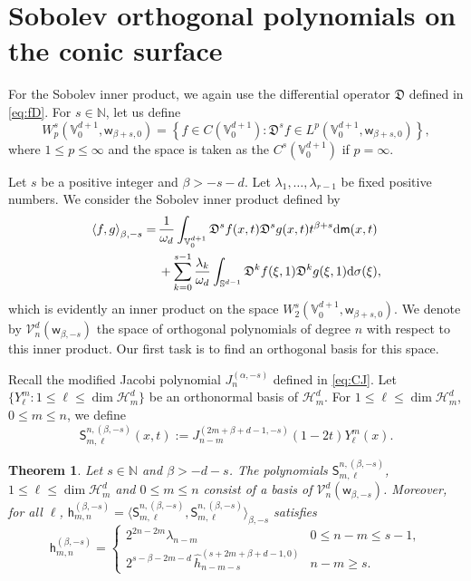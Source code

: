 \documentclass{amsart}
\newtheorem{thm}{Theorem}[section]
\theoremstyle{remark}
\def\la{{\langle}}
\def\ra{{\rangle}}
\def\d{\mathrm{d}}
\def\sh{{\mathsf h}}
\def\sm{{\mathsf m}}
\def\sw{{\mathsf w}}
\def\sS{{\mathsf S}}
\def\fD{{\mathfrak D}}
\def\a{{\alpha}}
\def\b{{\beta}}
\def\l{{\lambda}}
\def\o{{\omega}}
\def\s{\sigma}
\def\la{{\langle}}
\def\ra{{\rangle}}
\def\CH{{\mathcal H}}
\def\CV{{\mathcal V}}
\def\NN{{\mathbb N}}
\def\SS{{\mathbb S}}
\def\VV{{\mathbb V}}
\newcommand{\wh}{\widehat}
\begin{document}
\section{Sobolev orthogonal polynomials on the conic surface}
\setcounter{equation}{0}

For the Sobolev inner product, we again use the differential operator $\fD$ defined in \eqref{eq:fD}. 
For $s \in \NN$, let us define 
$$
W_p^s(\VV_0^{d+1}, \sw_{\b+s,0})= \left \{f\in C(\VV_0^{d+1}): \fD^s f\in L^p(\VV_0^{d+1},\sw_{\b+s,0})\right \},
$$
where $1 \le p \le \infty$ and the space is taken as the $C^s(\VV_0^{d+1})$ if $p = \infty$.

Let $s$ be a positive integer and $\b > -s-d$. Let $\l_1,\ldots,\l_{r-1}$ be fixed positive numbers. 
We consider the Sobolev inner product defined by
\begin{align} \label{eq:ipd-s}
  \la f,g\ra_{\b, -s} =\,& \frac{1}{\o_d}
       \int_{\VV_0^{d+1}} \fD^s f (x,t) \fD^s g(x,t) t^{\b+s} \d \sm(x,t)\\\
           &  + \sum_{k=0}^{s-1} \frac{\l_k}{\o_d} \int_{\SS^{d-1}}
              \fD^k f(\xi,1) \fD^k g(\xi,1) \d \s (\xi), \notag
\end{align}
which is evidently an inner product on the space $W_2^s(\VV_0^{d+1}, \sw_{\b+s,0})$. We denote by
$\CV_n^d(\sw_{\b,-s})$ the space of orthogonal polynomials of degree $n$ with respect to this inner product.
Our first task is to find an orthogonal basis for this space.

Recall the modified Jacobi polynomial $J_n^{(\a,-s)}$ defined in \eqref{eq:CJ}. Let
$\{Y_\ell^m: 1 \le \ell \le \dim \CH_m^d\}$ be an orthonormal basis of $\CH_m^d$. For $1 \le \ell \le \dim \CH_m^d$,
$0\le m \le n$, we define
\begin{equation} \label{eq:SOP-s}
    \sS_{m,\ell}^{n, (\b,-s)} (x,t) := J_{n-m}^{(2m+\b+d-1,-s)}(1-2 t) Y_\ell^m(x).
\end{equation}

\begin{thm} \label{thm:SOP-cone}
Let $s \in \NN$ and $\b > -d-s$. The polynomials $\sS_{m,\ell}^{n, (\b,-s)}$, $1 \le \ell \le \dim \CH_m^d$
and $0\le m \le n$ consist of a basis of $\CV_n^d(\sw_{\b,-s})$. Moreover, for all $\ell$, $\sh_{m,n}^{(\b,-s)}  =
\langle \sS_{m,\ell}^{n, (\b,-s)}, \sS_{m,\ell}^{n, (\b,-s)} \rangle_{\b,-s}$ satisfies
$$
 \sh_{m,n}^{(\b,-s)}   = \begin{cases}2^{2n-2m} \l_{n-m} &  0 \le n -m \le s-1, \\
      2^{s - \b-2m-d}\, \wh h_{n-m-s}^{(s+2m+\b+d-1,0)} & n-m \ge s. \end{cases}
$$
\end{thm}
\end{document}
